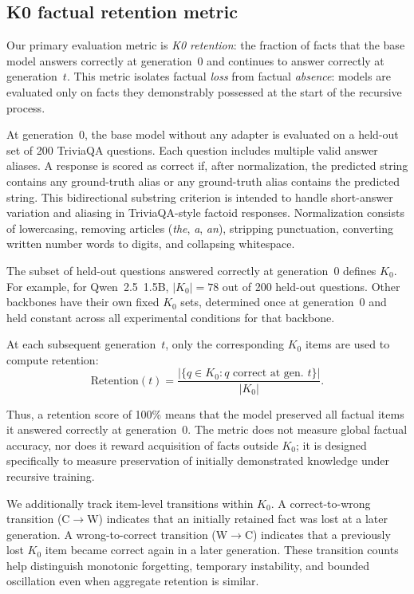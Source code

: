 \documentclass[a4paper,fleqn]{cas-dc}
\begin{document}
\subsection{K0 factual retention metric}\label{sec:k0}

Our primary evaluation metric is \textit{K0 retention}: the fraction of
facts that the base model answers correctly at generation~0 and continues to
answer correctly at generation~$t$. This metric isolates factual
\textit{loss} from factual \textit{absence}: models are evaluated only on
facts they demonstrably possessed at the start of the recursive process.

At generation~0, the base model without any adapter is evaluated on a held-out
set of 200 TriviaQA questions. Each question includes multiple valid answer
aliases. A response is scored as correct if, after normalization, the predicted
string contains any ground-truth alias or any ground-truth alias contains the
predicted string. This bidirectional substring criterion is intended to handle
short-answer variation and aliasing in TriviaQA-style factoid responses.
Normalization consists of lowercasing, removing articles
(\textit{the}, \textit{a}, \textit{an}), stripping punctuation, converting
written number words to digits, and collapsing whitespace.

The subset of held-out questions answered correctly at generation~0 defines
$K_0$. For example, for Qwen~2.5~1.5B, $|K_0|=78$ out of 200 held-out
questions. Other backbones have their own fixed $K_0$ sets, determined once at
generation~0 and held constant across all experimental conditions for that
backbone.

At each subsequent generation~$t$, only the corresponding $K_0$ items are used
to compute retention:
\begin{equation}\label{eq:k0}
  \mathrm{Retention}(t) =
  \frac{|\{q \in K_0 : q \text{ correct at gen.\ } t\}|}{|K_0|}.
\end{equation}

Thus, a retention score of 100\% means that the model preserved all factual
items it answered correctly at generation~0. The metric does not measure global
factual accuracy, nor does it reward acquisition of facts outside $K_0$; it is
designed specifically to measure preservation of initially demonstrated
knowledge under recursive training.

We additionally track item-level transitions within $K_0$. A
correct-to-wrong transition (C$\to$W) indicates that an initially retained fact
was lost at a later generation. A wrong-to-correct transition (W$\to$C)
indicates that a previously lost $K_0$ item became correct again in a later
generation. These transition counts help distinguish monotonic forgetting,
temporary instability, and bounded oscillation even when aggregate retention is
similar.
\end{document}

